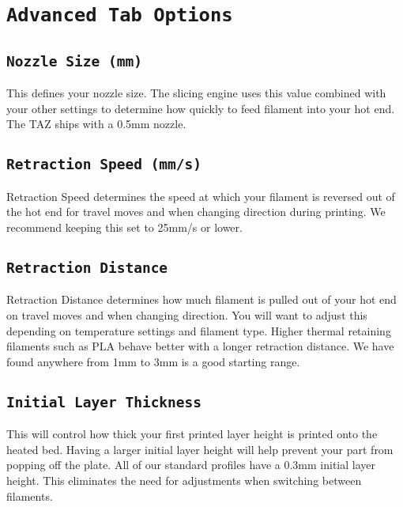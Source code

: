 \section{\texttt{Advanced Tab Options}}

\subsection{\texttt{Nozzle Size (mm)}}
This defines your nozzle size. The slicing engine uses this value combined with your other settings to determine how quickly to feed filament into your hot end. The TAZ ships with a 0.5mm nozzle. 


\subsection{\texttt{Retraction Speed (mm/s)}}
Retraction Speed determines the speed at which your filament is reversed out of the hot end for travel moves and when changing direction during printing. We recommend keeping this set to 25mm/s or lower.

\subsection{\texttt{Retraction Distance}}
Retraction Distance determines how much filament is pulled out of your hot end on travel moves and when changing direction. You will want to adjust this depending on temperature settings and filament type. Higher thermal retaining filaments such as PLA behave better with a longer retraction distance. We have found anywhere from 1mm to 3mm is a good starting range.

\subsection{\texttt{Initial Layer Thickness}}
This will control how thick your first printed layer height is printed onto the heated bed. Having a larger initial layer height will help prevent your part from popping off the plate. All of our standard profiles have a 0.3mm initial layer height. This eliminates the need for adjustments when switching between filaments.  %
